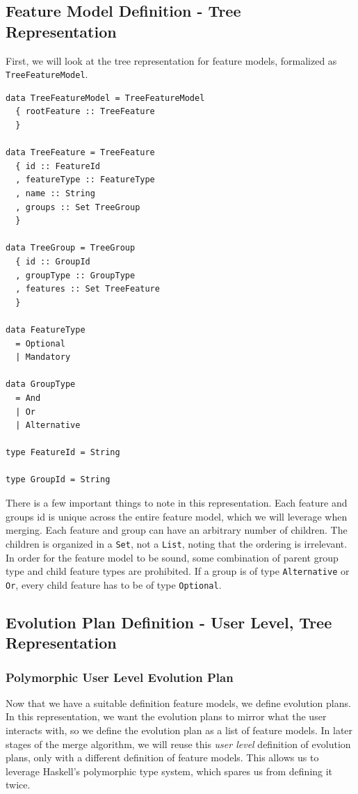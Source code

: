 \documentclass[a4paper,english]{ifimaster}
\begin{document}
\subsection{Feature Model Definition - Tree Representation}%
\label{sub:feature_model_definition_tree_representation}

First, we will look at the tree representation for feature models, formalized as \texttt{TreeFeatureModel}.

\begin{verbatim}
data TreeFeatureModel = TreeFeatureModel
  { rootFeature :: TreeFeature
  }

data TreeFeature = TreeFeature
  { id :: FeatureId
  , featureType :: FeatureType
  , name :: String
  , groups :: Set TreeGroup
  }

data TreeGroup = TreeGroup
  { id :: GroupId
  , groupType :: GroupType
  , features :: Set TreeFeature
  }

data FeatureType
  = Optional
  | Mandatory

data GroupType
  = And
  | Or
  | Alternative

type FeatureId = String

type GroupId = String
\end{verbatim}

There is a few important things to note in this representation. Each feature and groups id is unique across the entire feature model, which we will leverage when merging. Each feature and group can have an arbitrary number of children. The children is organized in a \texttt{Set}, not a \texttt{List}, noting that the ordering is irrelevant. In order for the feature model to be sound, some combination of parent group type and child feature types are prohibited. If a group is of type \texttt{Alternative} or \texttt{Or}, every child feature has to be of type \texttt{Optional}.

\subsection{Evolution Plan Definition - User Level, Tree Representation}%
\label{sub:evolution_plan_definition_user_level_tree_representation}

\subsubsection*{Polymorphic User Level Evolution Plan}%
\label{ssub:polymorphic_user_level_evolution_plan}

Now that we have a suitable definition feature models, we define evolution plans. In this representation, we want the evolution plans to mirror what the user interacts with, so we define the evolution plan as a list of feature models. In later stages of the merge algorithm, we will reuse this \textit{user level} definition of evolution plans, only with a different definition of feature models. This allows us to leverage Haskell's polymorphic type system, which spares us from defining it twice.
\end{document}
